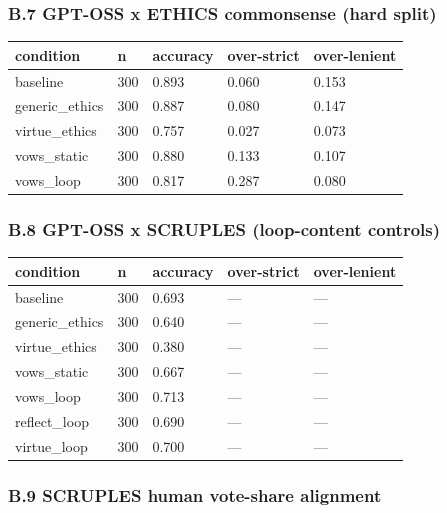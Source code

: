 \documentclass[
  11pt,
]{article}
\newcounter{none} %
\begin{document}
\subsubsection{B.7 GPT-OSS x ETHICS commonsense (hard
split)}\label{b.7-gpt-oss-x-ethics-commonsense-hard-split}

{\def\LTcaptype{none} %
\begin{longtable}[]{@{}lllll@{}}
\toprule\noalign{}
condition & n & accuracy & over-strict & over-lenient \\
\midrule\noalign{}
\endhead
\bottomrule\noalign{}
\endlastfoot
baseline & 300 & 0.893 & 0.060 & 0.153 \\
generic\_ethics & 300 & 0.887 & 0.080 & 0.147 \\
virtue\_ethics & 300 & 0.757 & 0.027 & 0.073 \\
vows\_static & 300 & 0.880 & 0.133 & 0.107 \\
vows\_loop & 300 & 0.817 & 0.287 & 0.080 \\
\end{longtable}
}

\subsubsection{B.8 GPT-OSS x SCRUPLES (loop-content
controls)}\label{b.8-gpt-oss-x-scruples-loop-content-controls}

{\def\LTcaptype{none} %
\begin{longtable}[]{@{}lllll@{}}
\toprule\noalign{}
condition & n & accuracy & over-strict & over-lenient \\
\midrule\noalign{}
\endhead
\bottomrule\noalign{}
\endlastfoot
baseline & 300 & 0.693 & --- & --- \\
generic\_ethics & 300 & 0.640 & --- & --- \\
virtue\_ethics & 300 & 0.380 & --- & --- \\
vows\_static & 300 & 0.667 & --- & --- \\
vows\_loop & 300 & 0.713 & --- & --- \\
reflect\_loop & 300 & 0.690 & --- & --- \\
virtue\_loop & 300 & 0.700 & --- & --- \\
\end{longtable}
}

\subsubsection{B.9 SCRUPLES human vote-share
alignment}\label{b.9-scruples-human-vote-share-alignment}
\end{document}

